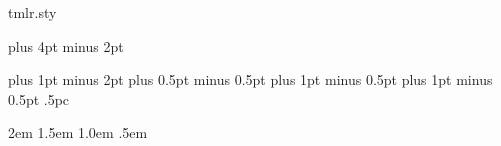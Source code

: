 \begin{filecontents*}{tmlr.sty}
\renewenvironment{abstract}{\vskip.075in\centerline{\large\bf\sffamily
Abstract}\vspace{0.5ex}\begin{quote}}{\par\end{quote}\vskip 1ex}

\def\section{\@startsection {section}{1}{\z@}{-2.0ex plus
    -0.5ex minus -.2ex}{1.5ex plus 0.3ex
minus0.2ex}{\large\bf\raggedright\sffamily}}

\def\subsection{\@startsection{subsection}{2}{\z@}{-1.8ex plus
-0.5ex minus -.2ex}{0.8ex plus .2ex}{\normalsize\bf\raggedright\sffamily}}
\def\subsubsection{\@startsection{subsubsection}{3}{\z@}{-1.5ex
plus      -0.5ex minus -.2ex}{0.5ex plus
.2ex}{\normalsize\bf\raggedright\sffamily}}
\def\paragraph{\@startsection{paragraph}{4}{\z@}{1.5ex plus
0.5ex minus .2ex}{-1em}{\normalsize\bf}}
\def\subparagraph{\@startsection{subparagraph}{5}{\z@}{1.5ex plus
  0.5ex minus .2ex}{-1em}{\normalsize\bf}}
\def\subsubsubsection{\vskip
5pt{\noindent\normalsize\rm\raggedright\sffamily}}


\footnotesep 6.65pt %
\skip\footins 9pt plus 4pt minus 2pt
\def\footnoterule{\kern-3pt \hrule width 12pc \kern 2.6pt }
\setcounter{footnote}{0}

\parindent 0pt
\topsep 4pt plus 1pt minus 2pt
\partopsep 1pt plus 0.5pt minus 0.5pt
\itemsep 2pt plus 1pt minus 0.5pt
\parsep 2pt plus 1pt minus 0.5pt
\parskip .5pc


\leftmargini\leftmargin \leftmarginii 2em
\leftmarginiii 1.5em \leftmarginiv 1.0em \leftmarginv .5em


\def\@listi{\leftmargin\leftmargini}
\def\@listii{\leftmargin\leftmarginii
   \labelwidth\leftmarginii\advance\labelwidth-\labelsep
   \topsep 2pt plus 1pt minus 0.5pt
   \parsep 1pt plus 0.5pt minus 0.5pt
   \itemsep \parsep}
\def\@listiii{\leftmargin\leftmarginiii
    \labelwidth\leftmarginiii\advance\labelwidth-\labelsep
    \topsep 1pt plus 0.5pt minus 0.5pt
    \parsep \z@ \partopsep 0.5pt plus 0pt minus 0.5pt
    \itemsep \topsep}
\def\@listiv{\leftmargin\leftmarginiv
     \labelwidth\leftmarginiv\advance\labelwidth-\labelsep}
\def\@listv{\leftmargin\leftmarginv
     \labelwidth\leftmarginv\advance\labelwidth-\labelsep}
\def\@listvi{\leftmargin\leftmarginvi
     \labelwidth\leftmarginvi\advance\labelwidth-\labelsep}


\end{filecontents*}
